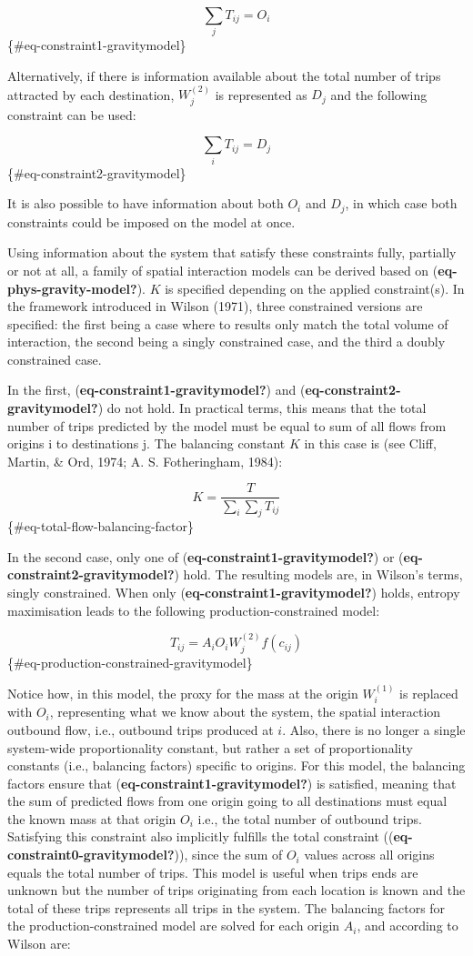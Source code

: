 \documentclass[
11pt, %
oneside, %
english, %
singlespacing, %
]{macthesis} %
\begin{document}
\[
\sum_j T_{ij} = O_i
\] \{\#eq-constraint1-gravitymodel\}

Alternatively, if there is information available about the total number of trips attracted by each destination, \(W_j^{(2)}\) is represented as \(D_j\) and the following constraint can be used:

\[
\sum_i T_{ij} = D_j
\] \{\#eq-constraint2-gravitymodel\}

It is also possible to have information about both \(O_i\) and \(D_j\), in which case both constraints could be imposed on the model at once.

Using information about the system that satisfy these constraints fully, partially or not at all, a family of spatial interaction models can be derived based on (\textbf{eq-phys-gravity-model?}). \(K\) is specified depending on the applied constraint(s). In the framework introduced in Wilson (1971), three constrained versions are specified: the first being a case where to results only match the total volume of interaction, the second being a singly constrained case, and the third a doubly constrained case.

In the first, (\textbf{eq-constraint1-gravitymodel?}) and (\textbf{eq-constraint2-gravitymodel?}) do not hold. In practical terms, this means that the total number of trips predicted by the model must be equal to sum of all flows from origins i to destinations j. The balancing constant \(K\) in this case is (see Cliff, Martin, \& Ord, 1974; A. S. Fotheringham, 1984):

\[
K=\frac{T}{\sum_i\sum_j T_{ij}}
\] \{\#eq-total-flow-balancing-factor\}

In the second case, only one of (\textbf{eq-constraint1-gravitymodel?}) or (\textbf{eq-constraint2-gravitymodel?}) hold. The resulting models are, in Wilson's terms, singly constrained. When only (\textbf{eq-constraint1-gravitymodel?}) holds, entropy maximisation leads to the following production-constrained model:

\[
T_{ij} = A_i O_i W_j^{(2)} f(c_{ij})
\] \{\#eq-production-constrained-gravitymodel\}

Notice how, in this model, the proxy for the mass at the origin \(W_i^{(1)}\) is replaced with \(O_i\), representing what we know about the system, the spatial interaction outbound flow, i.e., outbound trips produced at \(i\). Also, there is no longer a single system-wide proportionality constant, but rather a set of proportionality constants (i.e., balancing factors) specific to origins. For this model, the balancing factors ensure that (\textbf{eq-constraint1-gravitymodel?}) is satisfied, meaning that the sum of predicted flows from one origin going to all destinations must equal the known mass at that origin \(O_i\) i.e., the total number of outbound trips. Satisfying this constraint also implicitly fulfills the total constraint ((\textbf{eq-constraint0-gravitymodel?})), since the sum of \(O_i\) values across all origins equals the total number of trips. This model is useful when trips ends are unknown but the number of trips originating from each location is known and the total of these trips represents all trips in the system. The balancing factors for the production-constrained model are solved for each origin \(A_i\), and according to Wilson are:
\end{document}
